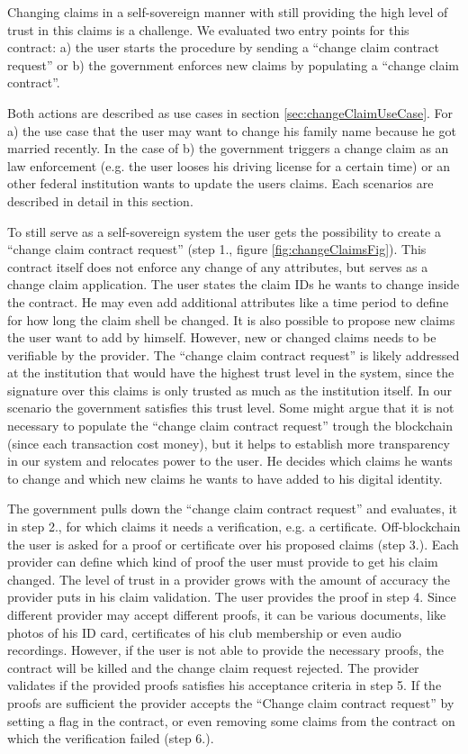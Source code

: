 Changing claims in a self-sovereign manner with still providing the high level of trust in this claims is a challenge. We evaluated two entry points for this contract: a) the user starts the procedure by sending a “change claim contract request” or b) the government enforces new claims by populating a “change claim contract”. 

Both actions are described as use cases in section \ref{sec:changeClaimUseCase}. For a) the use case that the user may want to change his family name because he got married recently. In the case of b) the government triggers a change claim as an law enforcement (e.g. the user looses his driving license for a certain time) or an other federal institution wants to update the users claims. Each scenarios are described in detail in this section. 

To still serve as a self-sovereign system the user gets the possibility to create a “change claim contract request” (step 1., figure \ref{fig:changeClaimsFig}). This contract itself does not enforce any change of any attributes, but serves as a change claim application. The user states the claim IDs he wants to change inside the contract. He may even add additional attributes like a time period to define for how long the claim shell be changed. It is also possible to propose new claims the user want to add by himself. However, new or changed claims needs to be verifiable by the provider. The “change claim contract request” is likely addressed at the institution that would have the highest trust level in the system, since the signature over this claims is only trusted as much as the institution itself. In our scenario the government satisfies this trust level. Some might argue that it is not necessary to populate the “change claim contract request” trough the blockchain (since each transaction cost money), but it helps to establish more transparency in our system and relocates power to the user. He decides which claims he wants to change and which new claims he wants to have added to his digital identity. 

The government pulls down the “change claim contract request” and evaluates, it in step 2., for which claims it needs a verification, e.g. a certificate. Off-blockchain the user is asked for a proof or certificate over his proposed claims (step 3.). Each provider can define which kind of proof the user must provide to get his claim changed. The level of trust in a provider grows with the amount of accuracy the provider puts in his claim validation. The user provides the proof in step 4. Since different provider may accept different proofs, it can be various documents, like photos of his ID card, certificates of his club membership or even audio recordings. However, if the user is not able to provide the necessary proofs, the contract will be killed and the change claim request rejected.
The provider validates if the provided proofs satisfies his acceptance criteria in step 5.  If the proofs are sufficient the provider accepts the “Change claim contract request” by setting a flag in the contract, or even removing some claims from the contract on which the verification failed (step 6.). 


